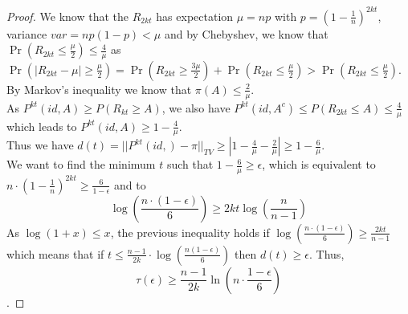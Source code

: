 \documentclass[a4paper]{article}
\begin{document}
\begin{proof}
We know that the $R_{2kt}$ has expectation $\mu = np$  with $p=\left ( 1 - \frac{1}{n} \right )^{2kt}$, variance $var = np(1-p) <\mu$ and by Chebyshev, we know that $\Pr(R_{2kt}\leq \frac{\mu}{2})\leq \frac{4}{\mu}$
as $\Pr(|R_{2kt} - \mu|\geq \frac{\mu}{2}) = \Pr(R_{2kt} \geq \frac{3\mu}{2}) + \Pr(R_{2kt} \leq \frac{\mu}{2}) > \Pr(R_{2kt} \leq \frac{\mu}{2})$.\\

By Markov's inequality we know that $\pi(A) \leq \frac{2}{\mu}$.\\

As $P^{kt}(id,A) \geq P(R_{kt}\geq A) $, we also have $P^{kt}(id,A^c) \leq P(R_{2kt}\leq A) \leq \frac{4}{\mu} $ which leads to $P^{kt}(id,A)\geq1 - \frac{4}{\mu}$.\\

Thus we have $d(t)=||P^{kt}(id,) - \pi ||_{TV} \geq |1 - \frac{4}{\mu} - \frac{2}{\mu}| \geq 1 - \frac{6}{\mu}$.\\

We want to find the minimum $t$ such that $1-\frac{6}{\mu}\geq \epsilon$, which is equivalent to $n \cdot \left ( 1 - \frac{1}{n} \right )^{2kt} \geq \frac{6}{1-\epsilon}$ and to
$$\log\left(\frac{n\cdot (1-\epsilon)}{6}\right) \geq 2kt \log \left ( \frac{n}{n-1} \right )$$
As $\log(1+x) \leq x$, the previous inequality holds if $\log\left(\frac{n\cdot (1-\epsilon)}{6}\right) \geq   \frac{2kt}{n-1} $ which means that if $t\leq \frac{n-1}{2k}\cdot \log\left ( \frac{n(1-\epsilon)}{6}\right )$ then $d(t)\geq \epsilon$.
Thus,
$$\tau \left (\epsilon \right ) \geq \frac{n-1}{2k} \ln(n\cdot \frac{1-\epsilon}{6}) $$.
\end{proof}
\end{document}

